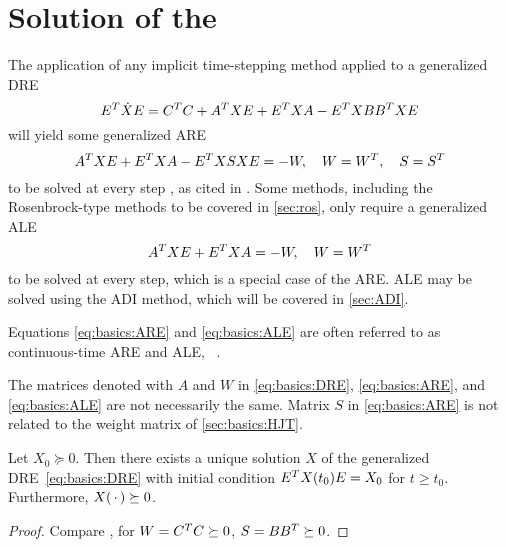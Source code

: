 \section{Solution of the \texorpdfstring{}{DRE}}
\label{sec:basics:matrixeqs}

The application of
any implicit time-stepping method applied to a generalized \ac{DRE}
\begin{equation}
\label{eq:basics:DRE}
  E^T \dot X E = C^T C + A^T X E + E^T X A - E^T X BB^T X E
\end{equation}
will yield some generalized \ac{ARE}
\begin{equation}
\label{eq:basics:ARE}
    A^T X E + E^T X A - E^T X S X E = -W,
    \quad
    W = W^T,
    \quad
    S = S^T
\end{equation}
to be solved at every step \cite{Dieci1992},
as cited in \cite[50]{Lang2015}.
Some methods, including the Rosenbrock-type methods to be covered in \autoref{sec:ros},
only require a generalized \ac{ALE}
\begin{equation}
\label{eq:basics:ALE}
  A^T X E + E^T X A = -W,
  \quad
  W = W^T
\end{equation}
to be solved at every step,
which is a special case of the \ac{ARE}.
\ac{ALE} may be solved \eg using the \ac{ADI} method,
which will be covered in \autoref{sec:ADI}.

\begin{remark}
  Equations \eqref{eq:basics:ARE} and \eqref{eq:basics:ALE} are often referred to as
  continuous-time \ac{ARE} and \ac{ALE}, \cf~\cite[Remark~2.11]{Lang2017}.
\end{remark}

\begin{remark}
  The matrices denoted with $A$ and $W$ in \eqref{eq:basics:DRE}, \eqref{eq:basics:ARE}, and \eqref{eq:basics:ALE} are not necessarily the same.
  Matrix $S$ in \eqref{eq:basics:ARE} is not related to the weight matrix of \autoref{sec:basics:HJT}.
\end{remark}

\begin{theorem}
  Let $X_0 \succeq 0$.
  Then there exists a unique solution $X$ of the generalized \ac{DRE}~\eqref{eq:basics:DRE}
  with initial condition $E^T X(t_0) E = X_0$ for $t \geq t_0$.
  Furthermore, $X(\optional{}) \succeq 0$.
\end{theorem}
\begin{proof}
  Compare \cite[Theorem~2.7]{Lang2017}, \cite[Theorem~4.1.6]{Abou2003}
  for $W = C^T C \succeq 0$, $S=BB^T \succeq 0$.
\end{proof}

